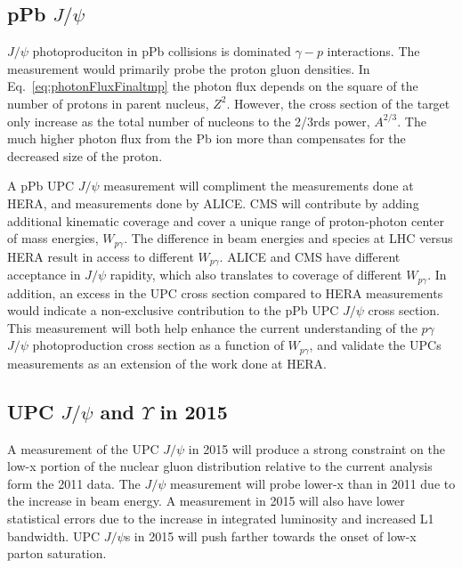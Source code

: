     \subsection{pPb $J/\psi$}
      $J/\psi$ photoproduciton in pPb collisions is dominated $\gamma-p$ 
        interactions.
      The measurement would primarily probe the proton gluon densities.
      In Eq.~\ref{eq:photonFluxFinaltmp} the photon flux depends on the square
      of the number of protons in parent nucleus, $Z^{2}$. 
      However, the cross section of the target only increase as the total 
        number of nucleons to the 2/3rds power, $A^{2/3}$.
      The much higher photon flux from the Pb ion more than compensates for 
        the decreased size of the proton.

      A pPb UPC $J/\psi$ measurement will compliment the measurements done at 
        HERA, and measurements done by ALICE.
      CMS will contribute by adding additional kinematic coverage and cover a 
        unique range of proton-photon center of mass energies, $W_{p\gamma}$. 
      The difference in beam energies and species at LHC versus HERA result in
        access to different $W_{p\gamma}$. 
      ALICE and CMS have different acceptance in $J/\psi$ rapidity, which also 
        translates to coverage of different $W_{p\gamma}$.
      In addition, an excess in the UPC cross section compared to HERA 
        measurements would indicate a non-exclusive contribution to the pPb UPC 
        $J/\psi$ cross section. 
      This measurement will both help enhance the current understanding of 
        the $p\gamma$ $J/\psi$ photoproduction cross section as a function of 
        $W_{p\gamma}$, and validate the UPCs measurements as an extension of 
        the work done at HERA.

    \subsection{UPC $J/\psi$ and $\Upsilon$ in 2015}
      A measurement of the UPC $J/\psi$ in 2015 will produce a strong constraint
        on the low-x portion of the nuclear gluon distribution relative to 
        the current analysis form the 2011 data. 
      The $J/\psi$ measurement will probe lower-x than in 2011 due to the 
        increase in beam energy. 
      A measurement in 2015 will also have lower statistical errors due to the 
        increase in integrated luminosity and increased L1 bandwidth.
      UPC $J/\psi$s in 2015 will push farther towards the onset of low-x parton 
        saturation.

